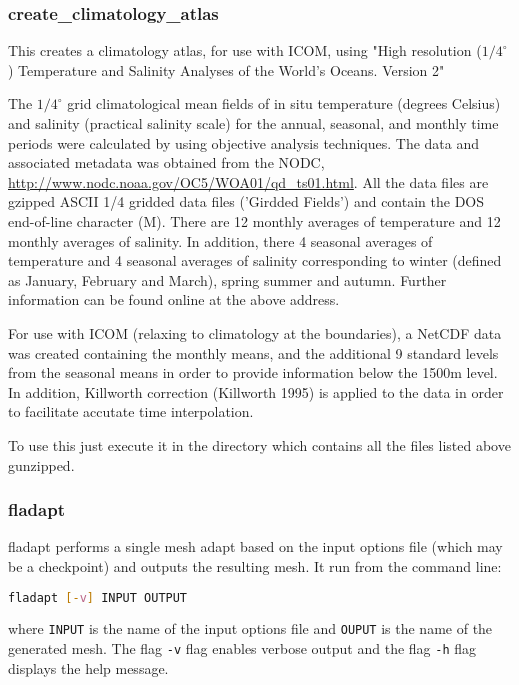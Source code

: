 
\subsubsection{create\_climatology\_atlas}
\label{sect:create_climatology_atlas}

This creates a climatology atlas, for use with ICOM, using "High resolution ($1/4 ^\circ$) Temperature and Salinity Analyses of the World's Oceans. Version 2"

The $1/4 ^\circ$ grid climatological mean fields of in situ temperature (degrees Celsius) and salinity (practical salinity scale) for the annual, seasonal, and monthly time periods were calculated by \cite{boyer2005} using objective analysis techniques. The data and associated metadata was obtained from the NODC, \url{http://www.nodc.noaa.gov/OC5/WOA01/qd_ts01.html}. All the data files are gzipped ASCII 1/4 gridded data files ('Girdded Fields') and contain the DOS end-of-line character (M). There are 12 monthly averages of temperature and 12 monthly averages of salinity. In addition, there 4 seasonal averages of temperature and 4 seasonal averages of salinity corresponding to winter (defined as January, February and March), spring summer and autumn. Further information can be found online at the above address.

For use with ICOM (relaxing to climatology at the boundaries), a NetCDF data was created containing the monthly means, and the additional 9 standard levels from the seasonal means in order to provide information below the 1500m level. In addition, Killworth correction (Killworth 1995) is applied to the data in order to facilitate accutate time interpolation.

To use this just execute it in the directory which contains all the files listed above gunzipped.


\subsubsection{fladapt}
\label{sect:fladapt}
fladapt performs a single mesh adapt based on the input options file (which may be a checkpoint) and outputs the resulting mesh. It run from the command line:

\begin{lstlisting}[language = Bash]
fladapt [-v] INPUT OUTPUT
\end{lstlisting}
where \lstinline[language = Bash]+INPUT+ is the name of the input options file and \lstinline[language = Bash]+OUPUT+ is the name of the generated mesh. The flag \lstinline[language = Bash]+-v+ flag enables verbose output and the flag \lstinline[language = Bash]+-h+ flag displays the help message.

